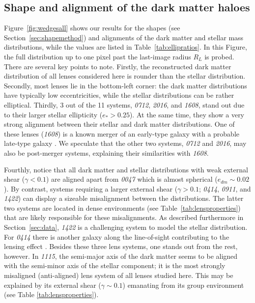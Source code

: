 \documentclass[useAMS,usenatbib]{mn2e}
\begin{document}
\subsection{Shape and alignment of the dark matter haloes}
Figure~\ref{fig:wedgesall} shows our results for the shapes (see Section~\ref{sec:shapemethod}) and alignments of the dark matter and stellar mass distributions, while the values are listed in Table~\ref{tab:ellipratios}. In this Figure, the full distribution up to one pixel past the last-image radius $R_{L}$ is probed. There are several key points to note. Firstly, the reconstructed dark matter distribution of all lenses considered here is rounder than the stellar distribution. Secondly, most lenses lie in the bottom-left corner: the dark matter distributions have typically low eccentricities, while the stellar distributions can be rather elliptical. Thirdly, 3 out of the 11 systems, {\it0712}, {\it2016}, and {\it1608}, stand out due to their larger stellar ellipticity ($e_* > 0.25$). At the same time, they show a very strong alignment between their stellar and dark matter distributions. One of these lenses ({\it1608}) is a known merger of an early-type galaxy with a probable late-type galaxy \citep{2003ApJ...584..100S}. We speculate that the other two systems, {\it0712} and {\it2016}, may also be post-merger systems, explaining their similarities with {\it1608}.

Fourthly, notice that all dark matter and stellar distributions with weak external shear ($\gamma < 0.1$) are aligned apart from {\it0047} which is almost spherical ($e_{dm}\sim0.02$). By contrast, systems requiring a larger external shear ($\gamma > 0.1$; {\it0414}, {\it0911}, and {\it1422}) can display a sizeable misalignment between the distributions. The latter two systems are located in dense environments (see Table~\ref{tab:lensproperties}) that are likely responsible for these misalignments. As described furthermore in Section~\ref{sec:data}, {\it1422} is a challenging system to model the stellar distribution. For {\it0414} there is another galaxy along the line-of-sight contributing to the lensing effect \citep{2011MNRAS.413L..86C}. Besides these three lens systems, one stands out from the rest, however. In {\it1115}, the semi-major axis of the dark matter seems to be aligned with the semi-minor axis of the stellar component; it is the most strongly misaligned (anti-aligned) lens system of all lenses studied here. This may be explained by its external shear ($\gamma \sim 0.1$) emanating from its group environment (see Table \ref{tab:lensproperties}).
\end{document}
